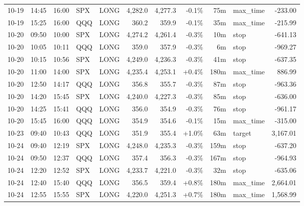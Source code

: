 \documentclass[11pt,a4paper,twoside]{article}
\begin{document}
\begin{center}
\begin{longtable}{>{\color{txtmain}}l l l l l r r r r >{\color{txtmain}}l r}
10-19 & 14:45 & 16:00 & SPX & LONG & 4,282.0 & 4,277.3 & \textcolor{lossred}{-0.1\%} & 75m & max\_time & \textcolor{lossred}{-233.00} \\
10-19 & 15:25 & 16:00 & QQQ & LONG & 360.2 & 359.9 & \textcolor{lossred}{-0.1\%} & 35m & max\_time & \textcolor{lossred}{-215.99} \\
10-20 & 09:50 & 10:00 & SPX & LONG & 4,274.2 & 4,261.4 & \textcolor{lossred}{-0.3\%} & 10m & stop & \textcolor{lossred}{-641.13} \\
10-20 & 10:05 & 10:11 & QQQ & LONG & 359.0 & 357.9 & \textcolor{lossred}{-0.3\%} & 6m & stop & \textcolor{lossred}{-969.27} \\
10-20 & 10:15 & 10:56 & SPX & LONG & 4,249.0 & 4,236.3 & \textcolor{lossred}{-0.3\%} & 41m & stop & \textcolor{lossred}{-637.35} \\
10-20 & 11:00 & 14:00 & SPX & LONG & 4,235.4 & 4,253.1 & \textcolor{wingreen}{+0.4\%} & 180m & max\_time & \textcolor{wingreen}{886.99} \\
10-20 & 12:50 & 14:17 & QQQ & LONG & 356.8 & 355.7 & \textcolor{lossred}{-0.3\%} & 87m & stop & \textcolor{lossred}{-963.36} \\
10-20 & 14:20 & 15:45 & SPX & LONG & 4,240.0 & 4,227.3 & \textcolor{lossred}{-0.3\%} & 85m & stop & \textcolor{lossred}{-636.00} \\
10-20 & 14:25 & 15:41 & QQQ & LONG & 356.0 & 354.9 & \textcolor{lossred}{-0.3\%} & 76m & stop & \textcolor{lossred}{-961.17} \\
10-20 & 15:45 & 16:00 & QQQ & LONG & 354.9 & 354.6 & \textcolor{lossred}{-0.1\%} & 15m & max\_time & \textcolor{lossred}{-315.00} \\
10-23 & 09:40 & 10:43 & QQQ & LONG & 351.9 & 355.4 & \textcolor{wingreen}{+1.0\%} & 63m & target & \textcolor{wingreen}{3,167.01} \\
10-24 & 09:40 & 12:19 & SPX & LONG & 4,248.0 & 4,235.3 & \textcolor{lossred}{-0.3\%} & 159m & stop & \textcolor{lossred}{-637.20} \\
10-24 & 09:50 & 12:37 & QQQ & LONG & 357.4 & 356.3 & \textcolor{lossred}{-0.3\%} & 167m & stop & \textcolor{lossred}{-964.93} \\
10-24 & 12:20 & 12:52 & SPX & LONG & 4,233.7 & 4,221.0 & \textcolor{lossred}{-0.3\%} & 32m & stop & \textcolor{lossred}{-635.06} \\
10-24 & 12:40 & 15:40 & QQQ & LONG & 356.5 & 359.4 & \textcolor{wingreen}{+0.8\%} & 180m & max\_time & \textcolor{wingreen}{2,664.01} \\
10-24 & 12:55 & 15:55 & SPX & LONG & 4,220.0 & 4,251.3 & \textcolor{wingreen}{+0.7\%} & 180m & max\_time & \textcolor{wingreen}{1,568.99} \\

\end{longtable}
\end{center}
\end{document}
